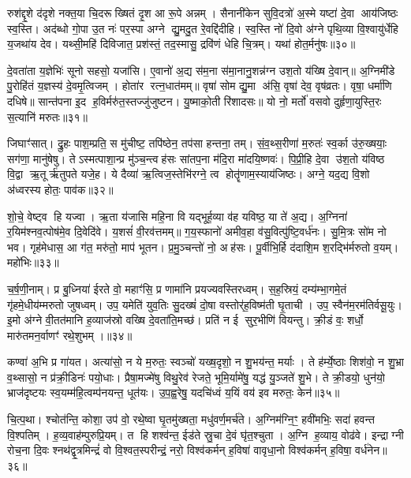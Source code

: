 रुश॑द्दृ॒शे द॑दृशे नक्त॒या चि॒दरूख्षितं दृ॒श आ रू॒पे अन्नम्। सैनानी॑केन सुवि॒दत्रो॑ अ॒स्मे यष्टा॑ दे॒वा आय॑जिष्ठः स्व॒स्ति। अद॑ब्धो गो॒पा उ॒त नः॑ पर॒स्पा अग्ने द्यु॒मदु॒त रे॒वद्दि॑दीहि। स्व॒स्ति नो॑ दि॒वो अ॑ग्ने पृथि॒व्या वि॒श्वायु॑र्धेहि य॒जथा॑य देव। यथ्सी॒महि॑ दिविजात॒ प्रश॑स्तं॒ तद॒स्मासु॒ द्रवि॑णं धेहि चि॒त्रम्। यथा॑ होत॒र्मनु॑षः॥३०॥

दे॒वता॑ता य॒ज्ञेभिः॑ सूनो सहसो॒ यजा॑सि। ए॒वानो॑ अ॒द्य स॑म॒ना स॑मा॒नानु॒शन्न॑ग्न उश॒तो य॑ख्षि दे॒वान्॥ अ॒ग्निमी॑डे पु॒रोहि॑तं य॒ज्ञस्य॑ दे॒वमृ॒त्विजम्। होता॑र रत्न॒धात॑मम्॥ वृषा॑ सोम द्यु॒मा अ॑सि॒ वृषा॑ देव॒ वृष॑व्रतः। वृषा॒ धर्मा॑णि दधिषे॥ सान्त॑पना इ॒द ह॒विर्मरु॑त॒स्तज्जु॑जुष्टन। यु॒ष्माको॒ती रि॑शादसः॥ यो नो॒ मर्तो॑ वसवो दुर्\mbox{}हृणा॒युस्ति॒रः स॒त्यानि॑ मरुतः॥३१॥

जिघाꣳ॑सात्। द्रु॒हः पाश॒म्प्रति॒ स मु॑चीष्ट॒ तपि॑ष्ठेन॒ तप॑सा हन्तना॒ तम्। सं॒व॒थ्स॒रीणा॑ म॒रुतः॑ स्व॒र्का उ॑रु॒ख्षयाः॒ सग॑णा॒ मानु॑षेषु। तेऽस्मत्पाशा॒न्प्र मु॑ञ्च॒न्त्वह॑सः सांतप॒ना म॑दि॒रा मा॑दयि॒ष्णवः॑। पि॒प्री॒हि दे॒वा उ॑श॒तो य॑विष्ठ वि॒द्वा ऋ॒तूर्\mbox{}ऋ॑तुपते यजे॒ह। ये दैव्या॑ ऋ॒त्विज॒स्तेभि॑रग्ने॒ त्व होतॄ॑णाम॒स्याय॑जिष्ठः। अग्ने॒ यद॒द्य वि॒शो अ॑ध्वरस्य होतः॒ पाव॑क॥३२॥

शो॒चे॒ वेष्ट्व हि यज्वा। ऋ॒ता य॑जासि महि॒ना वि यद्भूर्\mbox{}ह॒व्या व॑ह यविष्ठ॒ या ते॑ अ॒द्य। अ॒ग्निना॑ र॒यिम॑श्नव॒त्पोष॑मे॒व दि॒वेदि॑वे। य॒शसं॑ वी॒रव॑त्तमम्॥ ग॒य॒स्फानो॑ अमीव॒हा व॑सु॒वित्पु॑ष्टि॒वर्ध॑नः। सु॒मि॒त्रः सो॑म नो भव। गृह॑मेधास॒ आ ग॑त॒ मरु॑तो॒ माप॑ भूतन। प्र॒मु॒ञ्चन्तो॑ नो॒ अह॑सः। पू॒र्वीभि॒र्\mbox{}हि द॑दाशि॒म श॒रद्भि॑र्मरुतो व॒यम्। महो॑भिः॥३३॥

च॒र्\mbox{}ष॒णी॒नाम्। प्र बु॒ध्निया॑ ईरते वो॒ महाꣳ॑सि॒ प्र णामा॑नि प्रयज्यवस्तिरध्वम्। स॒ह॒स्रियं॒ दम्य॑म्भा॒गमे॒तं गृ॑हमे॒धीय॑म्मरुतो जुषध्वम्। उप॒ यमेति॑ युव॒तिः सु॒दख्षं॑ दो॒षा वस्तोर्\mbox{}॑ह॒विष्म॑ती घृ॒ताची। उप॒ स्वैन॑म॒रम॑तिर्वसू॒युः। इ॒मो अ॑ग्ने वी॒तत॑मानि ह॒व्याज॑स्रो वख्षि दे॒वता॑ति॒मच्छ॑। प्रति॑ न ई सुर॒भीणि॑ वियन्तु। क्री॒डं वः॒ शर्धो॒ मारु॑तमन॒र्वाणꣳ॑ रथे॒शुभम्।॥३४॥

कण्वा॑ अ॒भि प्र गा॑यत। अत्या॑सो॒ न ये म॒रुतः॒ स्वञ्चो॑ यख्ष॒दृशो॒ न शु॒भय॑न्त॒ मर्याः। ते ह॑र्म्ये॒ष्ठाः शिश॑वो॒ न शु॒भ्रा व॒थ्सासो॒ न प्र॑क्री॒डिनः॑ पयो॒धाः। प्रैषा॒मज्मे॑षु विथु॒रेव॑ रेजते॒ भूमि॒र्यामे॑षु॒ यद्ध॑ यु॒ञ्जते॑ शु॒भे। ते क्री॒डयो॒ धुन॑यो॒ भ्राज॑दृष्टयः स्व॒यम्म॑हि॒त्वम्प॑नयन्त॒ धूत॑यः। उ॒प॒ह्व॒रेषु॒ यदचि॑ध्वं य॒यिं वय॑ इव मरुतः॒ केन॑॥३५॥

चि॒त्प॒था। श्चोत॑न्ति॒ कोशा॒ उप॑ वो॒ रथे॒ष्वा घृ॒तमु॑ख्षता॒ मधु॑वर्ण॒मर्च॑ते। अ॒ग्निम॑ग्नि॒ꣳ॒ हवी॑मभिः॒ सदा॑ हवन्त वि॒श्पतिम्। ह॒व्य॒वाह॑म्पुरुप्रि॒यम्। त हि शश्व॑न्त॒ ईड॑ते स्रु॒चा दे॒वं घृ॑त॒श्चुता। अ॒ग्नि ह॒व्याय॒ वोढ॑वे। इन्द्राग्नी रोच॒ना दि॒वः श्नथ॑द्वृ॒त्रमिन्द्रं॑ वो वि॒श्वत॒स्परीन्द्रं॒ नरो॒ विश्व॑कर्मन् ह॒विषा॑ वावृधा॒नो विश्व॑कर्मन् ह॒विषा॒ वर्ध॑नेन॥३६॥

